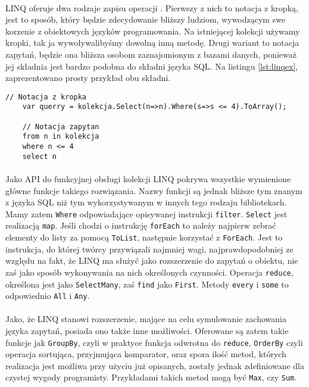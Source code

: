\documentclass[a4paper,10pt]{report}
\begin{document}
\paragraph{}
LINQ oferuje dwa rodzaje zapisu operacji \cite{linq}. Pierwszy z nich to notacja z kropką, jest to sposób, który będzie zdecydowanie bliższy ludziom, wywodzącym swe korzenie z obiektowych języków programowania. Na istniejącej kolekcji używamy kropki, tak ja wywoływalibyśmy dowolną inną metodę. Drugi wariant to notacja zapytań, będzie ona bliższa osobom zaznajomionym z bazami danych, ponieważ jej składnia jest bardzo podobna do składni języka SQL. Na listingu  \ref{lst:linqex}, zaprezentowano prosty przykład obu składni.
\begin{lstlisting}[caption={Dwie formy LINQ},style=sharpc,label={lst:linqex}]
	// Notacja z kropka
	var querry = kolekcja.Select(n=>n).Where(s=>s <= 4).ToArray();

	// Notacja zapytan
	from n in kolekcja
	where n <= 4
	select n
\end{lstlisting}
\paragraph{}
Jako API do funkcyjnej obsługi kolekcji LINQ pokrywa wszystkie wymienione główne funkcje takiego rozwiązania.
Nazwy funkcji są jednak bliższe tym znanym z języka SQL niż tym wykorzystywanym w innych tego rodzaju bibliotekach. Mamy zatem \verb|Where| odpowiadające opisywanej instrukcji \verb|filter|. \verb|Select| jest realizacją \verb|map|. Jeśli chodzi o instrukcję \verb|forEach| to należy najpierw zebrać elementy do listy za pomocą \verb|ToList|, następnie korzystać z \verb|ForEach|. Jest to instrukcja, do której twórcy przywiązali najmniej wagi, najprawdopodobniej ze względu na fakt, że LINQ ma służyć jako rozszerzenie do zapytań o obiektu, nie zaś jako sposób wykonywania na nich określonych czynności. Operacja \verb|reduce|, określona jest jako \verb|SelectMany|, zaś \verb|find| jako \verb|First|. Metody \verb|every| i \verb|some| to odpowiednio \verb|All| i \verb|Any|.
\paragraph{}
Jako, że LINQ stanowi rozszerzenie, mające na celu symulowanie zachowania języka zapytań, posiada ono także inne możliwości. Oferowane są zatem takie funkcje jak \verb|GroupBy|, czyli w praktyce funkcja odwrotna do \verb|reduce|, \verb|OrderBy| czyli operacja sortująca, przyjmująca komparator, oraz spora ilość metod, których realizacja jest możliwa przy użyciu już opisanych, zostały jednak zdefiniowane dla czystej wygody programisty. Przykładami takich metod mogą być \verb|Max|, czy \verb|Sum|.
\end{document}
